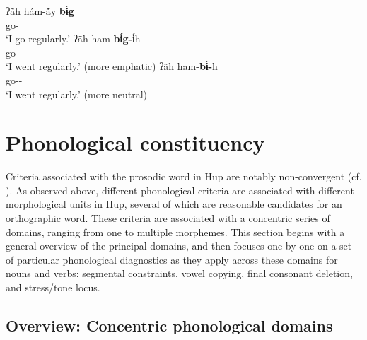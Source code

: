 \documentclass[output=paper]{langscibook}
\begin{document}
\ea\label{ex:hup:key:30} 
    \ea\label{ex:hup:key:30a}{
    \gll ʔãh hám-\'{ã}y \textbf{b\'ɨg}\\ 
    \First\Sg{} go-\Dynm{} \Hab{}\\ 
    \glt `I go regularly.'
    }
    \ex\label{ex:hup:key:30b}{
    \gll ʔãh ham-\textbf{b\'ɨg-}\'ɨh\\ 
    \First\Sg{} go-\Hab-\Decl{}\\ 
    \glt `I went regularly.' (more emphatic)
    }
    \ex\label{ex:hup:key:39c}{
    \gll ʔãh ham-\textbf{b\'ɨ-}h\\ 
    \First\Sg{} go-\Hab-\Decl{}\\
    \glt `I went regularly.' (more neutral)
    }
    \z 
\z 


\section{Phonological constituency}
\label{sec:hup:key:5}

Criteria associated with the prosodic word in Hup are notably non-convergent (cf. \citealt{Schiering2010}). As observed above, different phonological criteria are associated with different morphological units in Hup, several of which are reasonable candidates for an orthographic word. These criteria are associated with a concentric series of domains, ranging from one to multiple morphemes. This section begins with a general overview of the principal domains, and then focuses one by one on a set of particular phonological diagnostics as they apply across these domains for nouns and verbs: segmental constraints, vowel copying, final consonant deletion, and stress/tone locus.

\subsection{Overview: Concentric phonological domains} 
\label{sec:hup:key:5.1}
\end{document}
